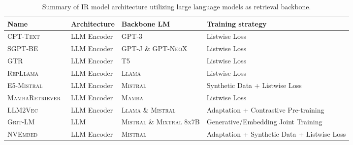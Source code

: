 
\begin{table*}[t!]
\centering
{} %
\resizebox{1\textwidth}{!}
{
\begin{tabular}{llll}
\toprule
\textbf{Name} & \textbf{Architecture} & \textbf{Backbone LM} & \textbf{Training strategy} \\
\midrule
\textsc{CPT-Text}~\cite{neelakantan2022text} & LLM Encoder & \textsc{GPT-3} & Listwise Loss \\
\textsc{SGPT-BE}~\cite{muennighoff2022sgpt} & LLM Encoder & \textsc{GPT-J} \& \textsc{GPT-NeoX} & Listwise Loss \\
\textsc{GTR}~\cite{ni-etal-2022-large} & LLM Encoder & \textsc{T5} & Listwise Loss \\
\textsc{RepLlama}~\cite{ma2024fine} & LLM Encoder & \textsc{Llama} & Listwise Loss \\
\textsc{E5-Mistral}~\cite{wang2023improving} & LLM Encoder & \textsc{Mistral} & Synthetic Data + Listwise Loss \\
\textsc{MambaRetriever}~\cite{zhang2024mambaretriever} & LLM Encoder & \textsc{Mamba} & Listwise Loss \\
\textsc{LLM2Vec}~\cite{behnamghader2024llmvec} & LLM Encoder & \textsc{Llama} \& \textsc{Mistral} & Adaptation + Contrastive Pre-training \\
\textsc{Grit-LM}~\cite{muennighoff2025generative} & LLM & \textsc{Mistral} \& \textsc{Mixtral 8x7B} & Generative/Embedding Joint Training \\ 
\textsc{NVEmbed}~\cite{lee2024nvembed} & LLM Encoder & \textsc{Mistral} & Adaptation + Synthetic Data + Listwise Loss \\
\bottomrule
\end{tabular}
}
\caption{Summary of IR model architecture utilizing large language models as retrieval backbone.}
\label{tab:llm4retrieval_appendix}
\end{table*}

